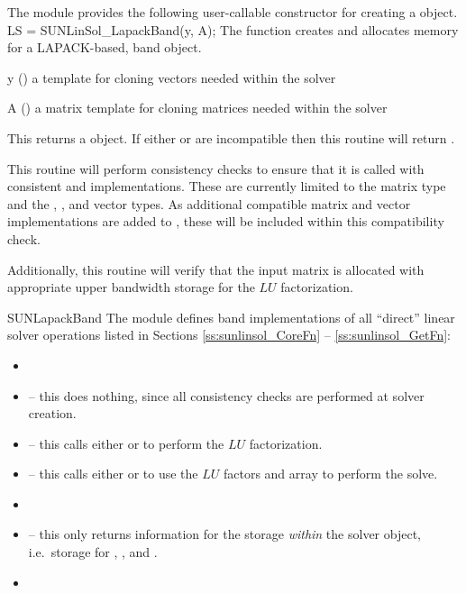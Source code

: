 The {\sunlinsollapband} module provides the following user-callable constructor
for creating a \newline {} object.
%
%
{
  LS = SUNLinSol\_LapackBand(y, A);
}
{
  The function  creates and allocates memory for
  a LAPACK-based, band  object.
}
{
  \begin{args}[y]
  \item[y] ()
    a template for cloning vectors needed within the solver
  \item[A] ()
    a {\sunmatband} matrix template for cloning matrices needed
    within the solver
  \end{args}
}
{
  This returns a  object.  If either  or
   are incompatible then this routine will return .
}
{
  This routine will perform consistency checks to ensure that it is
  called with consistent {\nvector} and {\sunmatrix} implementations.
  These are currently limited to the {\sunmatband} matrix type and
  the {\nvecs}, {\nvecopenmp}, and {\nvecpthreads} vector types.  As
  additional compatible matrix and vector implementations are added to
  {\sundials}, these will be included within this compatibility check.

  Additionally, this routine will verify that the input matrix 
  is allocated with appropriate upper bandwidth storage for the $LU$
  factorization.
}
{SUNLapackBand}
%
%
The {\sunlinsollapband} module defines band implementations of all
``direct'' linear solver operations listed in Sections
\ref{ss:sunlinsol_CoreFn} -- \ref{ss:sunlinsol_GetFn}:
\begin{itemize}
\item {}
\item {} -- this does nothing, since all
  consistency checks are performed at solver creation.
\item {} -- this calls either
   or  to perform the $LU$ factorization.
\item {} -- this calls either
   or  to use the $LU$ factors and 
  array to perform the solve.
\item {}
\item {} -- this only returns information for
  the storage \emph{within} the solver object, i.e.~storage
  for , , and .
\item {}
\end{itemize}


